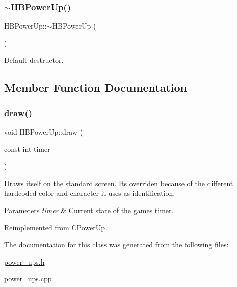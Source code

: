 \subsubsection{\texorpdfstring{$\sim$\+H\+B\+Power\+Up()}{~HBPowerUp()}}
{\footnotesize\ttfamily H\+B\+Power\+Up\+::$\sim$\+H\+B\+Power\+Up (\begin{DoxyParamCaption}{ }\end{DoxyParamCaption})}



Default destructor. 



\subsection{Member Function Documentation}
\mbox{\label{classHBPowerUp_ac9fcb7d3ef5f3a0561ffe0b6689944a1}} 
\subsubsection{\texorpdfstring{draw()}{draw()}}
{\footnotesize\ttfamily void H\+B\+Power\+Up\+::draw (\begin{DoxyParamCaption}\item[{const int}]{timer }\end{DoxyParamCaption})\hspace{0.3cm}{\ttfamily [virtual]}}

Draws itself on the standard screen. It\textquotesingle{}s overriden because of the different hardcoded color and character it uses as identification.


\begin{DoxyParams}{Parameters}
{\em timer} & Current state of the game\textquotesingle{}s timer. \\
\hline
\end{DoxyParams}


Reimplemented from \hyperlink{classCPowerUp_af1e0bad769efcde21858144596212e01}{C\+Power\+Up}.



The documentation for this class was generated from the following files\+:\begin{DoxyCompactItemize}
\item 
\hyperlink{power__ups_8h}{power\+\_\+ups.\+h}\item 
\hyperlink{power__ups_8cpp}{power\+\_\+ups.\+cpp}\end{DoxyCompactItemize}
